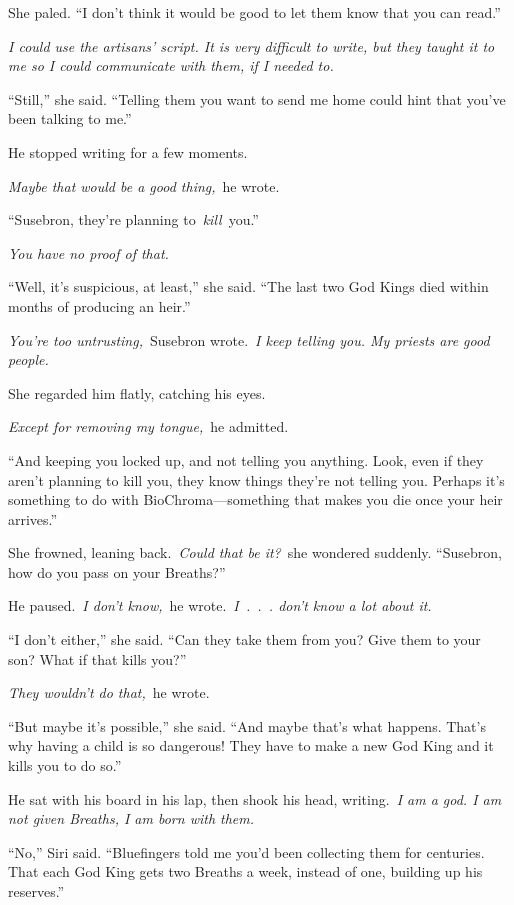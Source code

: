 She paled. “I don’t think it would be good to let them know that you can read.”

\textit{I could use the artisans’ script. It is very difficult to write, but they taught it to me so I could communicate with them, if I needed to.}

“Still,” she said. “Telling them you want to send me home could hint that you’ve been talking to me.”

He stopped writing for a few moments.

\textit{Maybe that would be a good thing,}~he wrote.

“Susebron, they’re planning to~\textit{kill}~you.”

\textit{You have no proof of that.}

“Well, it’s suspicious, at least,” she said. “The last two God Kings died within months of producing an heir.”

\textit{You’re too untrusting,}~Susebron wrote.~\textit{I keep telling you. My priests are good people.}

She regarded him flatly, catching his eyes.

\textit{Except for removing my tongue,}~he admitted.

“And keeping you locked up, and not telling you anything. Look, even if they aren’t planning to kill you, they know things they’re not telling you. Perhaps it’s something to do with BioChroma—something that makes you die once your heir arrives.”

She frowned, leaning back.~\textit{Could that be it?}~she wondered suddenly. “Susebron, how do you pass on your Breaths?”

He paused.~\textit{I don’t know,}~he wrote.~\textit{I~.~.~. don’t know a lot about it.}

“I don’t either,” she said. “Can they take them from you? Give them to your son? What if that kills you?”

\textit{They wouldn’t do that,}~he wrote.

“But maybe it’s possible,” she said. “And maybe that’s what happens. That’s why having a child is so dangerous! They have to make a new God King and it kills you to do so.”

He sat with his board in his lap, then shook his head, writing.~\textit{I am a god. I am not given Breaths, I am born with them.}

“No,” Siri said. “Bluefingers told me you’d been collecting them for centuries. That each God King gets two Breaths a week, instead of one, building up his reserves.”

